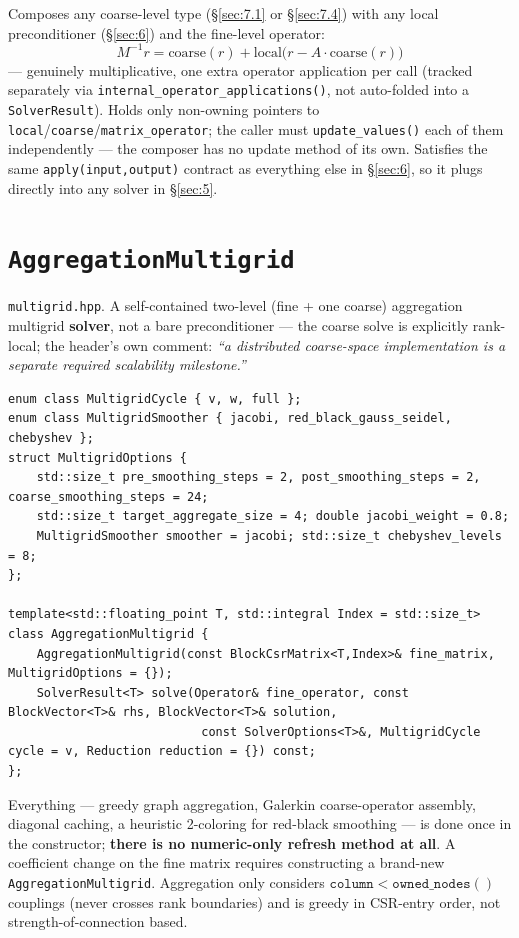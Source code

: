 \documentclass[11pt,a4paper]{report}
\newcommand{\secref}[1]{\S\ref{#1}}
\begin{document}
Composes any coarse-level type (\secref{sec:7.1} or \secref{sec:7.4})
with any local preconditioner (\secref{sec:6}) and the fine-level
operator:
\[
M^{-1} r = \mathrm{coarse}(r) + \mathrm{local}\bigl(r - A\cdot\mathrm{coarse}(r)\bigr)
\]
--- genuinely multiplicative, one extra operator application per call
(tracked separately via \lstinline!internal_operator_applications()!, not
auto-folded into a \lstinline!SolverResult!). Holds only non-owning pointers
to \lstinline!local!/\lstinline!coarse!/\lstinline!matrix_operator!; the caller must
\lstinline!update_values()! each of them independently --- the composer has
no update method of its own. Satisfies the same
\lstinline!apply(input,output)! contract as everything else in
\secref{sec:6}, so it plugs directly into any solver in \secref{sec:5}.

\section{\texorpdfstring{\lstinline!AggregationMultigrid!}{AggregationMultigrid}}
\label{sec:7.3}

\texttt{multigrid.hpp}. A self-contained two-level (fine + one coarse)
aggregation multigrid \textbf{solver}, not a bare preconditioner --- the
coarse solve is explicitly rank-local; the header's own comment:
\emph{``a distributed coarse-space implementation is a separate
required scalability milestone.''}

\begin{lstlisting}
enum class MultigridCycle { v, w, full };
enum class MultigridSmoother { jacobi, red_black_gauss_seidel, chebyshev };
struct MultigridOptions {
    std::size_t pre_smoothing_steps = 2, post_smoothing_steps = 2, coarse_smoothing_steps = 24;
    std::size_t target_aggregate_size = 4; double jacobi_weight = 0.8;
    MultigridSmoother smoother = jacobi; std::size_t chebyshev_levels = 8;
};

template<std::floating_point T, std::integral Index = std::size_t>
class AggregationMultigrid {
    AggregationMultigrid(const BlockCsrMatrix<T,Index>& fine_matrix, MultigridOptions = {});
    SolverResult<T> solve(Operator& fine_operator, const BlockVector<T>& rhs, BlockVector<T>& solution,
                           const SolverOptions<T>&, MultigridCycle cycle = v, Reduction reduction = {}) const;
};
\end{lstlisting}

Everything --- greedy graph aggregation, Galerkin coarse-operator
assembly, diagonal caching, a heuristic 2-coloring for red-black
smoothing --- is done once in the constructor; \textbf{there is no
numeric-only refresh method at all}. A coefficient change on the fine
matrix requires constructing a brand-new \lstinline!AggregationMultigrid!.
Aggregation only considers $\mathtt{column} < \mathtt{owned\_nodes()}$
couplings (never crosses rank boundaries) and is greedy in CSR-entry
order, not strength-of-connection based.
\end{document}
